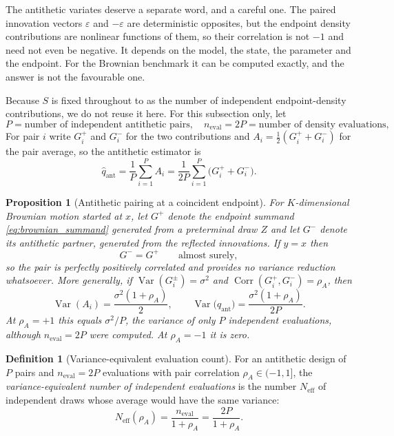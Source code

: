\documentclass[11pt]{article}
\newtheorem{proposition}[proposition]{Proposition}
\theoremstyle{definition}
\newtheorem{definition}[definition]{Definition}
\newcommand{\Var}{\operatorname{Var}}
\newcommand{\neval}{n_{\mathrm{eval}}}
\begin{document}
The antithetic variates deserve a separate word, and a careful one. The paired innovation vectors $\varepsilon$ and $-\varepsilon$ are deterministic opposites, but the endpoint density contributions are nonlinear functions of them, so their correlation is not $-1$ and need not even be negative. It depends on the model, the state, the parameter and the endpoint. For the Brownian benchmark it can be computed exactly, and the answer is not the favourable one.

Because $S$ is fixed throughout  to  as the number of independent endpoint-density contributions, we do not reuse it here. For this subsection only, let
\[
P=\text{number of independent antithetic pairs},
\quad
\neval=2P=\text{number of density evaluations},
\]
For pair $i$ write $G_i^{+}$ and $G_i^{-}$ for the two contributions and $A_i=\tfrac12(G_i^{+}+G_i^{-})$ for the pair average, so the antithetic estimator is
\begin{equation}\label{eq:antithetic_estimator}
\widehat q_{\mathrm{ant}}
=\frac1P\sum_{i=1}^PA_i
=\frac1{2P}\sum_{i=1}^P\bigl(G_i^{+}+G_i^{-}\bigr).
\end{equation}

\begin{proposition}[Antithetic pairing at a coincident endpoint]\label{prop:antithetic}
For $K$-dimensional Brownian motion started at $x$, let $G^{+}$ denote the endpoint summand \eqref{eq:brownian_summand} generated from a preterminal draw $Z$ and let $G^{-}$ denote its antithetic partner, generated from the reflected innovations. If $y=x$ then
\begin{equation}\label{eq:antithetic_identical}
G^{-}=G^{+}\qquad\text{almost surely},
\end{equation}
so the pair is perfectly \emph{positively} correlated and provides no variance reduction whatsoever. More generally, if $\Var(G_i^{\pm})=\sigma^2$ and $\operatorname{Corr}(G_i^{+},G_i^{-})=\rho_A$, then
\begin{equation}\label{eq:antithetic_variance}
\Var(A_i)=\frac{\sigma^2(1+\rho_A)}{2},
\qquad
\Var\bigl(\widehat q_{\mathrm{ant}}\bigr)=\frac{\sigma^2(1+\rho_A)}{2P} .
\end{equation}
At $\rho_A=+1$ this equals $\sigma^2/P$, the variance of only $P$ independent evaluations, although $\neval=2P$ were computed. At $\rho_A=-1$ it is zero.
\end{proposition}

\begin{definition}[Variance-equivalent evaluation count]\label{def:neff}
For an antithetic design of $P$ pairs and $\neval=2P$ evaluations with pair correlation $\rho_A\in(-1,1]$, the \emph{variance-equivalent number of independent evaluations} is the number $N_{\mathrm{eff}}$ of independent draws whose average would have the same variance:
\begin{equation}\label{eq:neff}
N_{\mathrm{eff}}(\rho_A)=\frac{\neval}{1+\rho_A}=\frac{2P}{1+\rho_A} .
\end{equation}
\end{definition}
\end{document}
